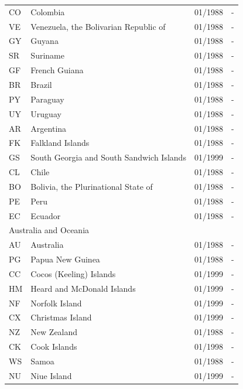 \begin{scriptsize}
\begin{longtable}{lp{8cm}p{2cm}p{2cm}}
	CO & Colombia                                 & 01/1988 & -  \\
	VE & Venezuela, the Bolivarian Republic of    & 01/1988 & -  \\
	GY & Guyana                                   & 01/1988 & -  \\
	SR & Suriname                                 & 01/1988 & -  \\
	GF & French Guiana                            & 01/1988 & -  \\
	BR & Brazil                                   & 01/1988 & -  \\
	PY & Paraguay                                 & 01/1988 & -  \\
	UY & Uruguay                                  & 01/1988 & -  \\
	AR & Argentina                                & 01/1988 & -  \\
	FK & Falkland Islands                         & 01/1988 & -  \\
	GS & South Georgia and South Sandwich Islands & 01/1999 & -  \\
	CL & Chile                                    & 01/1988 & -  \\
	BO & Bolivia, the Plurinational State of      & 01/1988 & -  \\
	PE & Peru                                     & 01/1988 & -  \\
	EC & Ecuador                                  & 01/1988 & -  \\
	\midrule
	\multicolumn{3}{l}{Australia and Oceania}  &  \\
	AU & Australia                       & 01/1988 & -  \\
	PG & Papua New Guinea                & 01/1988 & -  \\
	CC & Cocos (Keeling) Islands         & 01/1999 & -  \\
	HM & Heard and McDonald Islands      & 01/1999 & -  \\
	NF & Norfolk Island                  & 01/1999 & -  \\
	CX & Christmas Island                & 01/1999 & -  \\
	NZ & New Zealand                     & 01/1988 & -  \\
	CK & Cook Islands                    & 01/1998 & -  \\
	WS & Samoa                           & 01/1988 & -  \\
	NU & Niue Island                     & 01/1999 & -  \\

\end{longtable}
\end{scriptsize}
